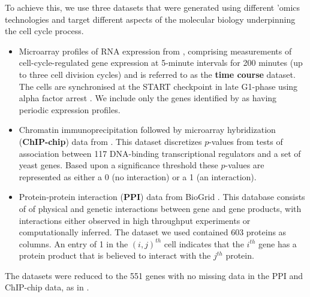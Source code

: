 \documentclass{bmcart}
\begin{document}
To achieve this, we use three datasets that were generated using different 'omics technologies and target different aspects of the molecular biology underpinning the cell cycle process.
\begin{itemize}
    \item Microarray profiles of RNA expression from \cite{granovskaia2010high}, comprising measurements of cell-cycle-regulated gene expression at 5-minute intervals for 200 minutes (up to three cell division cycles) and is referred to as the \textbf{time course} dataset. The cells are synchronised at the START checkpoint in late G1-phase using alpha factor arrest
    \citep{granovskaia2010high}. We include only the genes identified by \cite{granovskaia2010high} as having periodic expression profiles.
    \item Chromatin immunoprecipitation followed by microarray hybridization (\textbf{ChIP-chip}) data from \cite{harbison2004transcriptional}. This dataset discretizes $p$-values from tests of association between 117 DNA-binding transcriptional regulators and a set of yeast genes. Based upon a significance threshold these $p$-values are represented as either a 0 (no interaction) or a 1 (an interaction).
    \item Protein-protein interaction (\textbf{PPI}) data from BioGrid \citep{stark2006biogrid}. This database consists of of physical and genetic interactions between gene and gene products, with interactions either observed in high throughput experiments or computationally inferred. The dataset we used contained 603 proteins as columns. An entry of 1 in the $(i, j)^{th}$ cell indicates that the $i^{th}$ gene has a protein product that is believed to interact with the $j^{th}$ protein.
\end{itemize}
The datasets were reduced to the 551 genes with no missing data in the PPI and ChIP-chip data, as in \cite{kirk2012bayesian}. 
\end{document}
